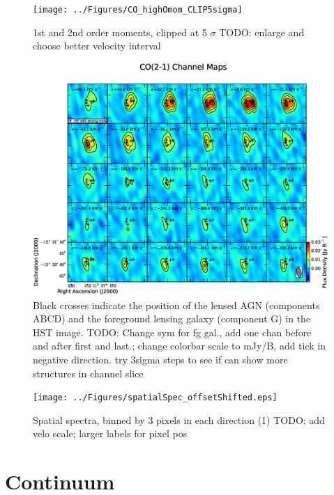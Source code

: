 \documentclass[]{emulateapj}
\begin{document}
\begin{figure}[tbph]
\centering
\texttt{[image: ../Figures/CO\_highOmom\_CLIP5sigma]}       
\caption{
1st and 2nd order moments, clipped at 5 $\sigma$
TODO: enlarge and choose better velocity interval
 \label{fig:}}
\end{figure}




\begin{figure}[tbph]
\centering
\includegraphics[width=\textwidth]{../Figures/co_channel_maps.eps}	 %
\caption{
Black crosses indicate the position of the lensed AGN (components ABCD) and the
foreground lensing galaxy (component G) in the HST image.
TODO: Change sym for fg gal., add one chan before and after first and last.; change colorbar scale to mJy/B, add tick in negative direction. try 3sigma steps to see if can show more structures in channel slice
 \label{fig:chanmap}}
\end{figure}

\begin{figure}[tbph]
\centering
\texttt{[image: ../Figures/spatialSpec\_offsetShifted.eps]}   
\caption{ 
Spatial spectra, binned by 3 pixels in each direction (1)
TODO: add velo scale; larger labels for pixel pos
 \label{fig:spatialSpec}}
\end{figure}



\section{Continuum}
\end{document}
